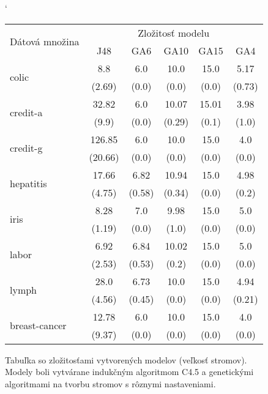 \begin{figure}[h]
\catcode`
\centering 
\newcommand\T{\rule{0pt}{2.6ex}}       %
\newcommand\B{\rule[-1.2ex]{0pt}{0pt}} %
\begin{tabular}{|l||c|c|c|c|c||}
\hline \multirow{2}{*}{Dátová množina} & \multicolumn{5}{|c||}{Zložitosť modelu} \\ 
\cline{2-6} & J48 & GA6 & GA10 & GA15 & GA4 \\
\hline
\hline \multirow{2}{*}{colic} & 8.8 & 6.0 & 10.0 & 15.0 & 5.17 \T\\[-1.5ex]
& \tiny (2.69) & \tiny (0.0) & \tiny (0.0) & \tiny (0.0) & \tiny (0.73)\B\\
\hline \multirow{2}{*}{credit-a} & 32.82 & 6.0 & 10.07 & 15.01 & 3.98 \T\\[-1.5ex]
& \tiny (9.9) & \tiny (0.0) & \tiny (0.29) & \tiny (0.1) & \tiny (1.0)\B\\
\hline \multirow{2}{*}{credit-g} & 126.85 & 6.0 & 10.0 & 15.0 & 4.0\T\\[-1.5ex]
& \tiny (20.66) & \tiny (0.0) & \tiny (0.0) & \tiny (0.0) & \tiny (0.0)\B\\
\hline \multirow{2}{*}{hepatitis} & 17.66 & 6.82 & 10.94 & 15.0 & 4.98 \T\\[-1.5ex]
& \tiny (4.75) & \tiny (0.58) & \tiny (0.34) & \tiny (0.0) & \tiny (0.2)\B\\
\hline \multirow{2}{*}{iris} & 8.28 & 7.0 & 9.98 & 15.0 & 5.0 \T\\[-1.5ex]
& \tiny (1.19) & \tiny (0.0) & \tiny (1.0) & \tiny (0.0) & \tiny (0.0)\B\\
\hline \multirow{2}{*}{labor} & 6.92 & 6.84 & 10.02 & 15.0 & 5.0 \T\\[-1.5ex]
& \tiny (2.53) & \tiny (0.53) & \tiny (0.2) & \tiny (0.0) & \tiny (0.0)\B\\
\hline \multirow{2}{*}{lymph} & 28.0 & 6.73 & 10.0 & 15.0 & 4.94 \T\\[-1.5ex]
& \tiny (4.56) & \tiny (0.45) & \tiny (0.0) & \tiny (0.0) & \tiny (0.21)\B\\
\hline \multirow{2}{*}{breast-cancer} & 12.78 & 6.0 & 10.0 & 15.0 & 4.0 \T\\[-1.5ex]
& \tiny (9.37) & \tiny (0.0) & \tiny (0.0) & \tiny (0.0) & \tiny (0.0)\B\\
\hline
\end{tabular}
\caption{Tabuľka so zložitosťami vytvorených modelov (veľkosť stromov). Modely boli vytvárane indukčným algoritmom C4.5 a genetickými algoritmami na tvorbu stromov s rôznymi nastaveniami.}\label{fig:size}
\end{figure}

